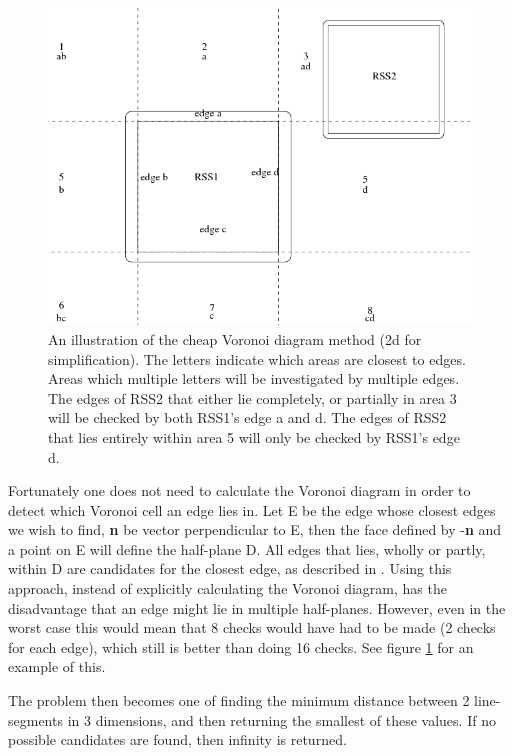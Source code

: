 \begin{figure}
\centering
\includegraphics[width=\textwidth]{figures/vorCheap}
\caption{\label{vor-cheap}An illustration of the cheap Voronoi diagram method (2d for simplification). The letters indicate which areas are closest to edges. Areas which multiple letters will be investigated by multiple edges. The edges of RSS2 that either lie completely, or partially in area 3 will be checked by both RSS1's edge a and d. The edges of RSS2 that lies entirely within area 5 will only be checked by RSS1's edge d.}
\end{figure}

Fortunately one does not need to calculate the Voronoi diagram in order to detect which Voronoi cell an edge lies in. Let E be the edge whose closest edges we wish to find, \textbf{n} be vector perpendicular to E, then the face defined by -\textbf{n} and a point on E will define the half-plane D. All edges that lies, wholly or partly, within D are candidates for the closest edge, as described in \cite{larsen00fast}. Using this approach, instead of explicitly calculating the Voronoi diagram, has the disadvantage that an edge might lie in multiple half-planes. However, even in the worst case this would mean that 8 checks would have had to be made (2 checks for each edge), which still is better than doing 16 checks. See figure \ref{vor-cheap} for an example of this.

The problem then becomes one of finding the minimum distance between 2 line-segments in 3 dimensions, and then returning the smallest of these values. If no possible candidates are found, then infinity is returned.

